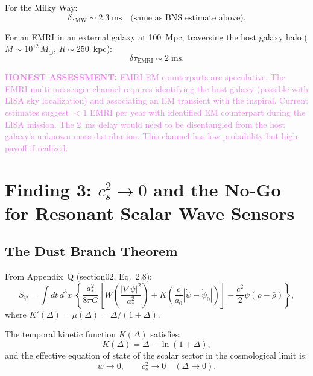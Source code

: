 \documentclass[11pt]{article}
\theoremstyle{definition}
\theoremstyle{remark}
\newcommand{\Msun}{M_\odot}
\newcommand{\astar}{a_*}
\newcommand{\azero}{a_0}
\newcommand{\honest}[1]{\textcolor{violet}{\textbf{HONEST ASSESSMENT:} #1}}
\begin{document}
For the Milky Way:
\begin{equation}
\delta\tau_{\mathrm{MW}} \sim 2.3\;\mathrm{ms}
\quad\text{(same as BNS estimate above)}.
\end{equation}

For an EMRI in an external galaxy at 100~Mpc, traversing the host
galaxy halo ($M \sim 10^{12}\,\Msun$, $R \sim 250$~kpc):
\begin{equation}
\delta\tau_{\mathrm{EMRI}} \sim 2\;\mathrm{ms}.
\end{equation}

\honest{EMRI EM counterparts are speculative. The EMRI multi-messenger
channel requires identifying the host galaxy (possible with LISA
sky localization) and associating an EM transient with the inspiral.
Current estimates suggest $< 1$ EMRI per year with identified EM
counterpart during the LISA mission. The 2~ms delay would need
to be disentangled from the host galaxy's unknown mass distribution.
This channel has low probability but high payoff if realized.}


\section{Finding 3: $c_s^2 \to 0$ and the No-Go for Resonant Scalar
  Wave Sensors}
\label{sec:cs-nogo}

\subsection{The Dust Branch Theorem}

From Appendix~Q (section02, Eq.~2.8):
\begin{equation}
S_\psi = \int dt\,d^3x\;\left\{
\frac{\astar^2}{8\pi G}\left[
  W\!\left(\frac{|\nabla\psi|^2}{\astar^2}\right)
  + K\!\left(\frac{c}{\azero}|\dot\psi - \dot\psi_0|\right)
\right]
- \frac{c^2}{2}\psi(\rho - \bar\rho)
\right\},
\label{eq:full-action}
\end{equation}
where $K'(\Delta) = \mu(\Delta) = \Delta/(1+\Delta)$.

The temporal kinetic function $K(\Delta)$ satisfies:
\begin{equation}
K(\Delta) = \Delta - \ln(1 + \Delta),
\end{equation}
and the effective equation of state of the scalar sector in the
cosmological limit is:
\begin{equation}
w \to 0, \qquad c_s^2 \to 0 \quad (\Delta \to 0).
\label{eq:dust-branch}
\end{equation}
\end{document}
